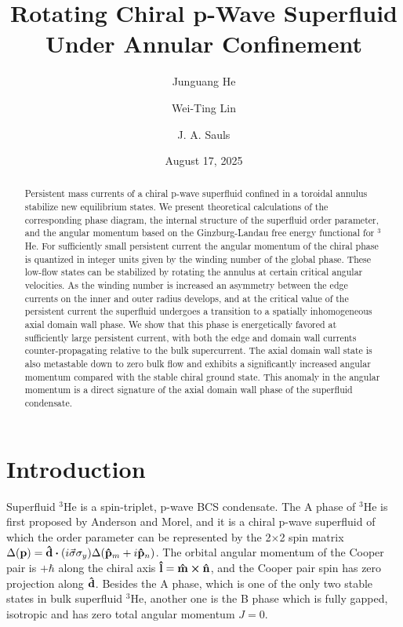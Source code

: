 \documentclass[aps,prb,reprint,groupedaddress]{revtex4-2}
\begin{document}
\title{Rotating Chiral p-Wave Superfluid Under Annular Confinement}
\author{Junguang He}
\author{Wei-Ting Lin}
\author{J. A. Sauls}
\date{August 17, 2025}

\begin{abstract}
    Persistent mass currents of a chiral p-wave superfluid confined in a toroidal annulus
    stabilize new equilibrium states. We present theoretical calculations of the
    corresponding phase diagram, the internal structure of the superfluid order parameter,
    and the angular momentum based on the Ginzburg-Landau free energy functional for
    $^3$He. For sufficiently small persistent current the angular momentum of the chiral
    phase is quantized in integer units given by the winding number of the global phase.
    These low-flow states can be stabilized by rotating the annulus at certain critical
    angular velocities. As the winding number is increased an asymmetry between the edge
    currents on the inner and outer radius develops, and at the critical value of the
    persistent current the superfluid undergoes a transition to a spatially inhomogeneous
    axial domain wall phase. We show that this phase is energetically favored at
    sufficiently large persistent current, with both the edge and domain wall currents
    counter-propagating relative to the bulk supercurrent. The axial domain wall state
    is also metastable down to zero bulk flow and exhibits a significantly increased
    angular momentum compared with the stable chiral ground state. This anomaly in the
    angular momentum is a direct signature of the axial domain wall phase of the
    superfluid condensate.
\end{abstract}

\maketitle

\section{Introduction}

Superfluid $^3$He is a spin-triplet, p-wave BCS condensate\cite{vollhardt13}.
The A phase of $^3$He is first proposed by Anderson and Morel\cite{Anderson61},
and it is a chiral p-wave superfluid of which the order parameter can be
represented by the 2$\times$2 spin matrix
$\Delta(\vb{p})=\vu{d}\vdot(i\va{\sigma}\sigma_y)\Delta(\vu{p}_m+i\vu{p}_n)$.
The orbital angular momentum of the Cooper pair is $+\hbar$ along the chiral
axis $\vu{l}=\vu{m}\cp\vu{n}$, and the Cooper pair spin has zero projection
along $\vu{d}$. Besides the A phase, which is one of the only two stable states
in bulk superfluid $^3$He, another one is the B phase which is fully gapped,
isotropic and has zero total angular momentum $J=0$.
\end{document}
